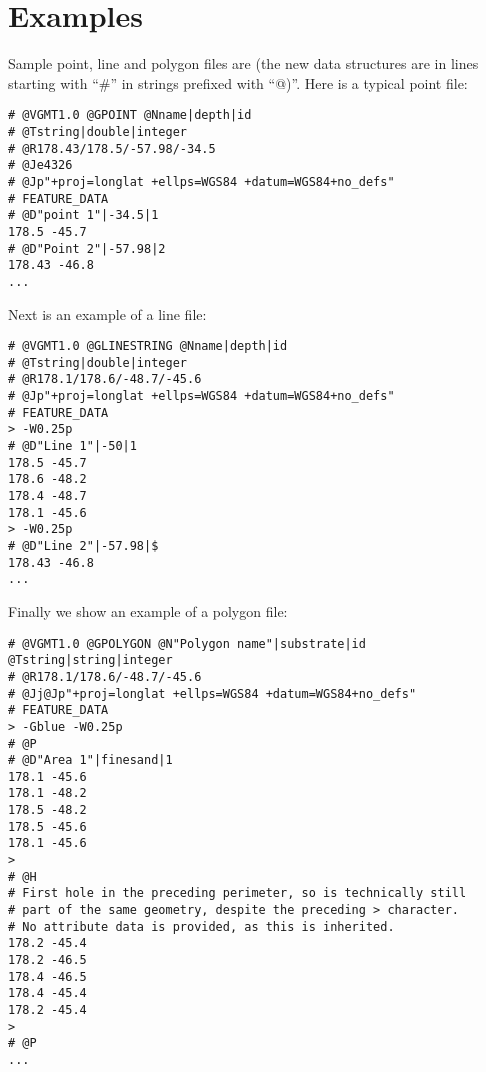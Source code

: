 \section{Examples}

Sample point, line and polygon files are (the new data structures are in
lines starting with ``\#'' in
strings prefixed with ``@)''.  Here is a typical point file:

\begin{verbatim}
# @VGMT1.0 @GPOINT @Nname|depth|id
# @Tstring|double|integer
# @R178.43/178.5/-57.98/-34.5
# @Je4326
# @Jp"+proj=longlat +ellps=WGS84 +datum=WGS84+no_defs"
# FEATURE_DATA
# @D"point 1"|-34.5|1
178.5 -45.7
# @D"Point 2"|-57.98|2
178.43 -46.8
...
\end{verbatim}

Next is an example of a line file:

\begin{verbatim}
# @VGMT1.0 @GLINESTRING @Nname|depth|id
# @Tstring|double|integer
# @R178.1/178.6/-48.7/-45.6
# @Jp"+proj=longlat +ellps=WGS84 +datum=WGS84+no_defs"
# FEATURE_DATA
> -W0.25p
# @D"Line 1"|-50|1
178.5 -45.7
178.6 -48.2
178.4 -48.7
178.1 -45.6
> -W0.25p
# @D"Line 2"|-57.98|$
178.43 -46.8
...
\end{verbatim}

Finally we show an example of a polygon file:

\begin{verbatim}
# @VGMT1.0 @GPOLYGON @N"Polygon name"|substrate|id @Tstring|string|integer
# @R178.1/178.6/-48.7/-45.6
# @Jj@Jp"+proj=longlat +ellps=WGS84 +datum=WGS84+no_defs"
# FEATURE_DATA
> -Gblue -W0.25p
# @P
# @D"Area 1"|finesand|1
178.1 -45.6
178.1 -48.2
178.5 -48.2
178.5 -45.6
178.1 -45.6
>
# @H
# First hole in the preceding perimeter, so is technically still
# part of the same geometry, despite the preceding > character.
# No attribute data is provided, as this is inherited.
178.2 -45.4
178.2 -46.5
178.4 -46.5
178.4 -45.4
178.2 -45.4
>
# @P
...
\end{verbatim}
